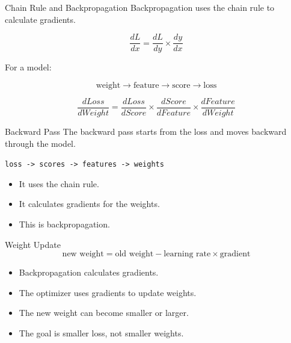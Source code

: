 \documentclass{beamer}
\begin{document}
\begin{frame}{Chain Rule and Backpropagation}
\small
Backpropagation uses the chain rule to calculate gradients.

\[
\frac{dL}{dx}
=
\frac{dL}{dy}
\times
\frac{dy}{dx}
\]

\vspace{0.15cm}

For a model:

\[
\text{weight} \rightarrow \text{feature} \rightarrow \text{score} \rightarrow \text{loss}
\]

\[
\frac{dLoss}{dWeight}
=
\frac{dLoss}{dScore}
\times
\frac{dScore}{dFeature}
\times
\frac{dFeature}{dWeight}
\]
\end{frame}

\begin{frame}{Backward Pass}
\small
The backward pass starts from the loss and moves backward through the model.

\vspace{0.25cm}

\begin{center}
\texttt{loss -> scores -> features -> weights}
\end{center}

\vspace{0.25cm}

\begin{itemize}
    \item It uses the chain rule.
    \item It calculates gradients for the weights.
    \item This is backpropagation.
\end{itemize}
\end{frame}

\begin{frame}{Weight Update}
\large
\[
\text{new weight}
=
\text{old weight}
-
\text{learning rate}
\times
\text{gradient}
\]

\vspace{0.35cm}

\normalsize
\begin{itemize}
    \item Backpropagation calculates gradients.
    \item The optimizer uses gradients to update weights.
    \item The new weight can become smaller or larger.
    \item The goal is smaller loss, not smaller weights.
\end{itemize}
\end{frame}
\end{document}
